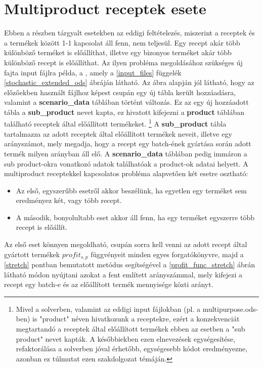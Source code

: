\section{Multiproduct receptek esete} \label{extended_multiproduct}
Ebben a részben tárgyalt esetekben az eddigi feltételezés, miszerint a receptek és a termékek között 1-1 kapcsolat áll fenn, nem teljesül.
Egy recept akár több különböző terméket is előállíthat, illetve egy bizonyos terméket akár több különböző recept is előállíthat.
Az ilyen probléma megoldásához szükséges új fajta input fájlra példa, a , amely a \ref{input_files} függelék \ref{stochastic_extended_ods} ábráján látható.
Az ábra alapján jól látható, hogy az előzőekben használt  fájlhoz képest csupán egy új tábla került hozzáadásra, valamint a \textbf{scenario\_data} táblában történt változás.
Ez az egy új hozzáadott tábla a \textbf{sub\_product} nevet kapta, ez hivatott kifejezni a \textbf{product} táblában található receptek által előállított termékeket. \footnote{Mivel a solverben, valamint az eddigi input fájlokban (pl. a multipurpose.ods-ben) is "product" néven hivatkozunk a receptekre, ezért a konzekvenciát megtartandó a receptek által előállított termékek ebben az esetben a "sub product" nevet kapták. A későbbiekben ezen elnevezések egységesítése, refaktorálása a solverben jóval érhetőbb, egységesebb kódot eredményezne, azonban ez túlmutat ezen szakdolgozat témáján.}
A \textbf{sub\_product} tábla tartalmazza az adott receptek által előállított termékek neveit, illetve egy arányszámot, mely megadja, hogy a recept egy batch-ének gyártása során adott termék milyen arányban áll elő.
A \textbf{scenario\_data} táblában pedig immáron a sub product-okra vonatkozó adatok találhatóak a product-ok adatai helyett.
A multiproduct receptekkel kapcsolatos probléma alapvetően két esetre osztható:
\begin{itemize}
\item Az első, egyszerűbb esetről akkor beszélünk, ha egyetlen egy terméket sem eredményez két, vagy több recept.
\item A második, bonyolultabb eset akkor áll fenn, ha egy terméket egyszerre több recept is előállít.
\end{itemize}
Az első eset könnyen megoldható, csupán sorra kell venni az adott recept által gyártott termékek $profit_{s,p}$ függvényeit minden egyes forgatókönyvre, majd a \ref{stretch} pontban bemutatott metódus segítségével a \ref{profit_func_stretch} ábrán látható módon nyújtani azokat a fent említett arányszámmal, mely kifejezi a recept egy batch-e és az előállított termék mennyisége közti arányt.
